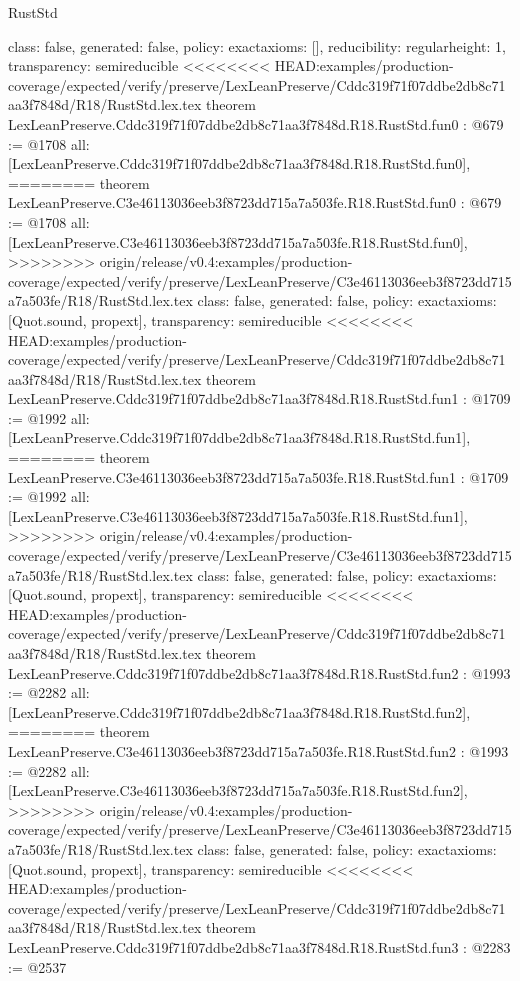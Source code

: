 \begin{lexlean}{RustStd}
\begin{coremodule}
{\begin{coremodule}
{{{  class: false,
  generated: false,
  policy: exact{axioms: []},
  reducibility: regular{height: 1},
  transparency: semireducible
}
<<<<<<<< HEAD:examples/production-coverage/expected/verify/preserve/LexLeanPreserve/Cddc319f71f07ddbe2db8c71aa3f7848d/R18/RustStd.lex.tex
theorem LexLeanPreserve.Cddc319f71f07ddbe2db8c71aa3f7848d.R18.RustStd.fun0 : @679 := @1708 {
  all: [LexLeanPreserve.Cddc319f71f07ddbe2db8c71aa3f7848d.R18.RustStd.fun0],
========
theorem LexLeanPreserve.C3e46113036eeb3f8723dd715a7a503fe.R18.RustStd.fun0 : @679 := @1708 {
  all: [LexLeanPreserve.C3e46113036eeb3f8723dd715a7a503fe.R18.RustStd.fun0],
>>>>>>>> origin/release/v0.4:examples/production-coverage/expected/verify/preserve/LexLeanPreserve/C3e46113036eeb3f8723dd715a7a503fe/R18/RustStd.lex.tex
  class: false,
  generated: false,
  policy: exact{axioms: [Quot.sound, propext]},
  transparency: semireducible
}
<<<<<<<< HEAD:examples/production-coverage/expected/verify/preserve/LexLeanPreserve/Cddc319f71f07ddbe2db8c71aa3f7848d/R18/RustStd.lex.tex
theorem LexLeanPreserve.Cddc319f71f07ddbe2db8c71aa3f7848d.R18.RustStd.fun1 : @1709 := @1992 {
  all: [LexLeanPreserve.Cddc319f71f07ddbe2db8c71aa3f7848d.R18.RustStd.fun1],
========
theorem LexLeanPreserve.C3e46113036eeb3f8723dd715a7a503fe.R18.RustStd.fun1 : @1709 := @1992 {
  all: [LexLeanPreserve.C3e46113036eeb3f8723dd715a7a503fe.R18.RustStd.fun1],
>>>>>>>> origin/release/v0.4:examples/production-coverage/expected/verify/preserve/LexLeanPreserve/C3e46113036eeb3f8723dd715a7a503fe/R18/RustStd.lex.tex
  class: false,
  generated: false,
  policy: exact{axioms: [Quot.sound, propext]},
  transparency: semireducible
}
<<<<<<<< HEAD:examples/production-coverage/expected/verify/preserve/LexLeanPreserve/Cddc319f71f07ddbe2db8c71aa3f7848d/R18/RustStd.lex.tex
theorem LexLeanPreserve.Cddc319f71f07ddbe2db8c71aa3f7848d.R18.RustStd.fun2 : @1993 := @2282 {
  all: [LexLeanPreserve.Cddc319f71f07ddbe2db8c71aa3f7848d.R18.RustStd.fun2],
========
theorem LexLeanPreserve.C3e46113036eeb3f8723dd715a7a503fe.R18.RustStd.fun2 : @1993 := @2282 {
  all: [LexLeanPreserve.C3e46113036eeb3f8723dd715a7a503fe.R18.RustStd.fun2],
>>>>>>>> origin/release/v0.4:examples/production-coverage/expected/verify/preserve/LexLeanPreserve/C3e46113036eeb3f8723dd715a7a503fe/R18/RustStd.lex.tex
  class: false,
  generated: false,
  policy: exact{axioms: [Quot.sound, propext]},
  transparency: semireducible
}
<<<<<<<< HEAD:examples/production-coverage/expected/verify/preserve/LexLeanPreserve/Cddc319f71f07ddbe2db8c71aa3f7848d/R18/RustStd.lex.tex
theorem LexLeanPreserve.Cddc319f71f07ddbe2db8c71aa3f7848d.R18.RustStd.fun3 : @2283 := @2537 {
}}}}}}
\end{coremodule}}
\end{coremodule}
\end{lexlean}
